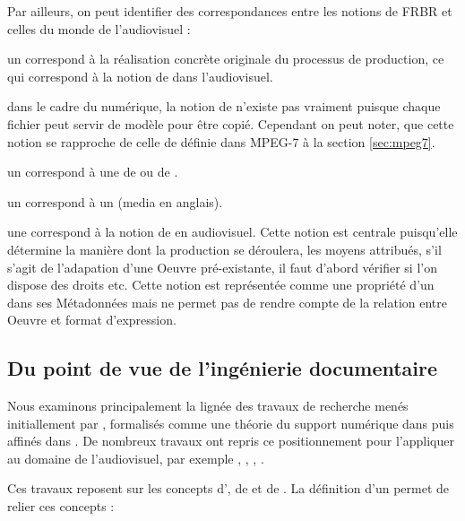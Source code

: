 Par ailleurs, on peut identifier des correspondances entre les notions de FRBR et celles du monde de l'audiovisuel :
\begin{liste}
	\item un  correspond à la réalisation concrète originale du processus de production, ce qui correspond à la notion de  dans l'audiovisuel.
	
	\item dans le cadre du numérique, la notion de  n'existe pas vraiment puisque chaque fichier peut servir de modèle pour être copié. 
	Cependant on peut noter, que cette notion se rapproche de celle de  définie dans MPEG-7 à la section \ref{sec:mpeg7}.

	\item un  correspond à une  de  ou de .
	\item un  correspond à un  (media en anglais).

	\item une  correspond à la notion de  en audiovisuel.
	Cette notion est centrale puisqu'elle détermine la manière dont la production se déroulera, les moyens attribués, s'il s'agit de l'adapation d'une Oeuvre pré-existante, il faut d'abord vérifier si l'on dispose des droits etc.
	Cette notion est représentée comme une propriété d'un  dans ses Métadonnées mais ne permet pas de rendre compte de la relation entre Oeuvre et format d'expression.
\end{liste}


\subsection{Du point de vue de l'ingénierie documentaire}
Nous examinons principalement la lignée des travaux de recherche menés initiallement par \cite{Bachimont1998}, formalisés comme une théorie du support numérique dans \cite{bachimont:hdr} puis affinés dans \cite{bachimont:icc}. 
De nombreux travaux ont repris ce positionnement pour l'appliquer au domaine de l'audiovisuel, par exemple \cite{Prie1999}, \cite{Troncy2004}, \cite{Morizet-mahoudeaux2005a}, \cite{Gaillard2008}.

Ces travaux reposent sur les concepts d', de  et de . 
La définition d'un  permet de relier ces concepts : 
 

